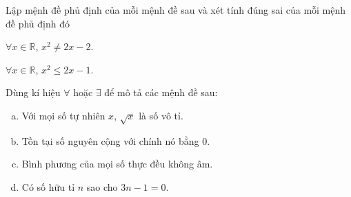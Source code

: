 \begin{bt}%
	Lập mệnh đề phủ định của mỗi mệnh đề  sau và xét tính đúng sai của mỗi mệnh đề phủ định đó
	\begin{listEX}[2]
		\item $\forall  x \in \mathbb{R}$, $x^2 \neq 2x-2$.
		\item  $\forall x \in \mathbb{R}$, $x^2 \leq 2x-1$.
	\end{listEX}
\end{bt}

\begin{bt}%
	Dùng kí hiệu $\forall$ hoặc $\exists$ để mô tả các mệnh đề  sau:
	\begin{enumerate} [a)]
		\item Với mọi số tự nhiên $x$,  $\sqrt{x}$ là số vô tỉ.
		\item Tồn tại số  nguyên cộng với chính nó bằng $0$.
		\item  Bình phương của mọi số thực đều không âm.
		\item Có số hữu tỉ $n$  sao cho $3 n-1=0$.
	\end{enumerate}
\end{bt}

